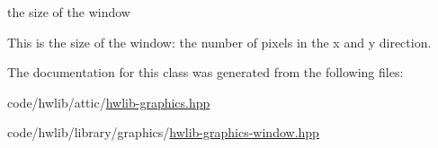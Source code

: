 the size of the window 

This is the size of the window\+: the number of pixels in the x and y direction. 

The documentation for this class was generated from the following files\+:\begin{DoxyCompactItemize}
\item 
code/hwlib/attic/\hyperlink{hwlib-graphics_8hpp}{hwlib-\/graphics.\+hpp}\item 
code/hwlib/library/graphics/\hyperlink{hwlib-graphics-window_8hpp}{hwlib-\/graphics-\/window.\+hpp}\end{DoxyCompactItemize}
